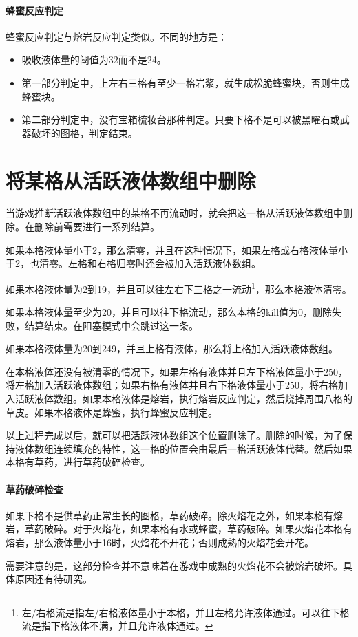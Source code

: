 \paragraph*{蜂蜜反应判定}\label{app25}
蜂蜜反应判定与熔岩反应判定类似。不同的地方是：
\begin{itemize}
    \item 吸收液体量的阈值为32而不是24。
    \item 第一部分判定中，上左右三格有至少一格岩浆，就生成松脆蜂蜜块，否则生成蜂蜜块。
    \item 第二部分判定中，没有宝箱梳妆台那种判定。只要下格不是可以被黑曜石或武器破坏的图格，判定结束。
\end{itemize}

\section{将某格从活跃液体数组中删除}
当游戏推断活跃液体数组中的某格不再流动时，就会把这一格从活跃液体数组中删除。在删除前需要进行一系列结算。

如果本格液体量小于2，那么清零，并且在这种情况下，如果左格或右格液体量小于2，也清零。左格和右格归零时还会被加入活跃液体数组。

如果本格液体量为2到19，并且可以往左右下三格之一流动\footnote{左/右格流是指左/右格液体量小于本格，并且左格允许液体通过。可以往下格流是指下格液体不满，并且允许液体通过。}，那么本格液体清零。

如果本格液体量至少为20，并且可以往下格流动，那么本格的kill值为0，删除失败，结算结束。在阻塞模式中会跳过这一条。

如果本格液体量为20到249，并且上格有液体，那么将上格加入活跃液体数组。

在本格液体还没有被清零的情况下，如果左格有液体并且左下格液体量小于250，将左格加入活跃液体数组；如果右格有液体并且右下格液体量小于250，将右格加入活跃液体数组。如果本格液体是熔岩，执行熔岩反应判定，然后烧掉周围八格的草皮。如果本格液体是蜂蜜，执行蜂蜜反应判定。

以上过程完成以后，就可以把活跃液体数组这个位置删除了。删除的时候，为了保持液体数组连续填充的特性，这一格的位置会由最后一格活跃液体代替。然后如果本格有草药，进行草药破碎检查。

\paragraph*{草药破碎检查}
如果下格不是供草药正常生长的图格，草药破碎。除火焰花之外，如果本格有熔岩，草药破碎。对于火焰花，如果本格有水或蜂蜜，草药破碎。如果火焰花本格有熔岩，那么液体量小于16时，火焰花不开花；否则成熟的火焰花会开花。

需要注意的是，这部分检查并不意味着在游戏中成熟的火焰花不会被熔岩破坏。具体原因还有待研究。